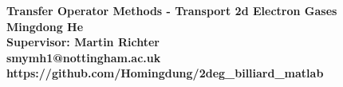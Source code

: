 \documentclass[a0,portrait]{a0poster}
\begin{document}



\begin{minipage}[b]{0.75\linewidth}
\VeryHuge \color{NavyBlue} \textbf{Transfer Operator Methods - Transport 2d Electron Gases}
\color{Black}\\[0.4cm] 
\Large \textbf{Mingdong He}\\
\Large \textbf{Supervisor: Martin Richter}\\
\large \textbf{\Letter \space smymh1@nottingham.ac.uk}\\
\large \textbf{\faGithub \space 
https://github.com/Homingdung/2deg\_billiard\_matlab}
\end{minipage}
%


\end{document}
